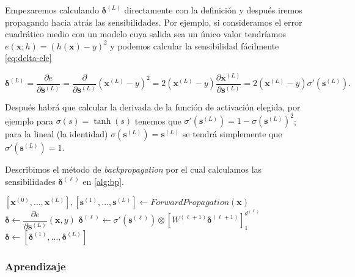 Empezaremos calculando $\pmb{\delta}^{(L)}$ directamente con la definición y después iremos propagando hacia atrás las sensibilidades. Por ejemplo, si consideramos el error cuadrático medio con un modelo cuya salida sea un único valor tendríamos $e(\textbf{x}; h) = (h(\textbf{x}) - y)^2$ y podemos calcular la sensibilidad fácilmente \eqref{eq:delta-ele}

\begin{equation}
  \pmb{\delta}^{(L)} = \dfrac{\partial e}{\partial \textbf{s}^{(L)}} = \dfrac{\partial}{\partial \textbf{s}^{(L)}} (\textbf{x}^{(L)} - y)^2 = 2(\textbf{x}^{(L)} - y) \dfrac{\partial \textbf{x}^{(L)}}{\partial \textbf{s}^{(L)}} = 2(\textbf{x}^{(L)} - y)\sigma'(\textbf{s}^{(L)}).
  \label{eq:delta-ele}
\end{equation}

Después habrá que calcular la derivada de la función de activación elegida, por ejemplo para $\sigma(s) = \tanh(s)$ tenemos que $\sigma'(\textbf{s}^{(L)}) = 1 - \sigma(\textbf{s}^{(L)})^2$; para la lineal (la identidad) $\sigma(\textbf{s}^{(L)}) = \textbf{s}^{(L)}$ se tendrá simplemente que $\sigma'(\textbf{s}^{(L)}) = 1$.

Describimos el método de \emph{backpropagation} por el cual calculamos las sensibilidades $\pmb{\delta}^{(\ell)}$ en \autoref{alg:bp}.

\begin{algorithm}[htbp]
\SetAlgoLined
 $\left[\textbf{x}^{(0)}, \ldots, \textbf{x}^{(L)}\right], \left[\textbf{s}^{(1)}, \ldots, \textbf{s}^{(L)}\right] \gets ForwardPropagation(\textbf{x})$\;
 $\pmb{\delta} \gets \dfrac{\partial e}{\partial \textbf{s}^{(L)}}(\textbf{x}, y)$\;
  {
  $\pmb{\delta}^{(\ell)} \gets \sigma'(\textbf{s}^{(\ell)}) \otimes \left[W^{(\ell + 1)}\pmb{\delta}^{(\ell + 1)}\right]^{d^{(\ell)}}_1$
 }
 $\pmb{\delta} \gets \left[\pmb{\delta}^{(1)}, \ldots, \pmb{\delta}^{(L)}\right]$\;
 \KwResult{$\pmb{\delta}$}
 \caption{$BackPropagation(\textbf{x}, y)$}
 \label{alg:bp}
\end{algorithm}

\subsubsection{Aprendizaje}

